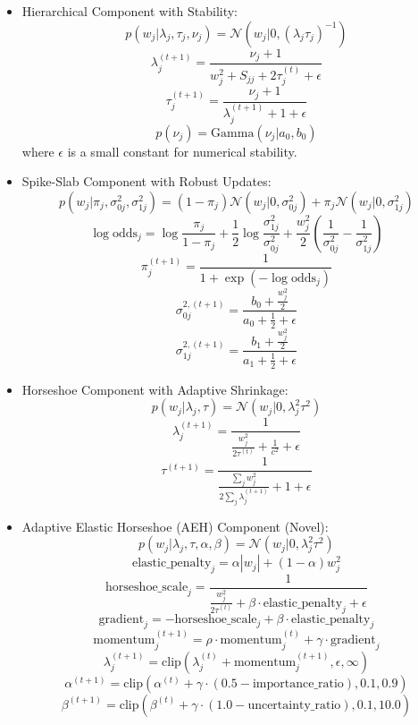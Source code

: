 \begin{itemize}

\item Hierarchical Component with Stability:
    \[
    p(w_j|\lambda_j,\tau_j,\nu_j) = \mathcal{N}(w_j|0,(\lambda_j\tau_j)^{-1})
    \]
    \[
    \lambda_j^{(t+1)} = \frac{\nu_j + 1}{w_j^2 + S_{jj} + 2\tau_j^{(t)} + \epsilon}
    \]
    \[
    \tau_j^{(t+1)} = \frac{\nu_j + 1}{\lambda_j^{(t+1)} + 1 + \epsilon}
    \]
    \[
    p(\nu_j) = \text{Gamma}(\nu_j|a_0,b_0)
    \]
    where $\epsilon$ is a small constant for numerical stability.

\item Spike-Slab Component with Robust Updates:
    \[
    p(w_j|\pi_j,\sigma^2_{0j},\sigma^2_{1j}) = (1-\pi_j)\mathcal{N}(w_j|0,\sigma^2_{0j}) + \pi_j\mathcal{N}(w_j|0,\sigma^2_{1j})
    \]
    \[
    \log \text{odds}_j = \log\frac{\pi_j}{1-\pi_j} + \frac{1}{2}\log\frac{\sigma^2_{1j}}{\sigma^2_{0j}} + \frac{w_j^2}{2}(\frac{1}{\sigma^2_{0j}} - \frac{1}{\sigma^2_{1j}})
    \]
    \[
    \pi_j^{(t+1)} = \frac{1}{1 + \exp(-\log \text{odds}_j)}
    \]
    \[
    \sigma_{0j}^{2,(t+1)} = \frac{b_0 + \frac{w_j^2}{2}}{a_0 + \frac{1}{2} + \epsilon}
    \]
    \[
    \sigma_{1j}^{2,(t+1)} = \frac{b_1 + \frac{w_j^2}{2}}{a_1 + \frac{1}{2} + \epsilon}
    \]

\item Horseshoe Component with Adaptive Shrinkage:
    \[
    p(w_j|\lambda_j,\tau) = \mathcal{N}(w_j|0,\lambda_j^2\tau^2)
    \]
    \[
    \lambda_j^{(t+1)} = \frac{1}{\frac{w_j^2}{2\tau^{(t)}} + \frac{1}{c^2} + \epsilon}
    \]
    \[
    \tau^{(t+1)} = \frac{1}{\frac{\sum_j w_j^2}{2\sum_j \lambda_j^{(t+1)}} + 1 + \epsilon}
    \]

\item Adaptive Elastic Horseshoe (AEH) Component (Novel):
    \[
    p(w_j|\lambda_j,\tau,\alpha,\beta) = \mathcal{N}(w_j|0,\lambda_j^2\tau^2)
    \]
    \[
    \text{elastic\_penalty}_j = \alpha|w_j| + (1-\alpha)w_j^2
    \]
    \[
    \text{horseshoe\_scale}_j = \frac{1}{\frac{w_j^2}{2\tau^{(t)}} + \beta \cdot \text{elastic\_penalty}_j + \epsilon}
    \]
    \[
    \text{gradient}_j = -\text{horseshoe\_scale}_j + \beta \cdot \text{elastic\_penalty}_j
    \]
    \[
    \text{momentum}_j^{(t+1)} = \rho \cdot \text{momentum}_j^{(t)} + \gamma \cdot \text{gradient}_j
    \]
    \[
    \lambda_j^{(t+1)} = \text{clip}(\lambda_j^{(t)} + \text{momentum}_j^{(t+1)}, \epsilon, \infty)
    \]
    \[
    \alpha^{(t+1)} = \text{clip}(\alpha^{(t)} + \gamma \cdot (0.5 - \text{importance\_ratio}), 0.1, 0.9)
    \]
    \[
    \beta^{(t+1)} = \text{clip}(\beta^{(t)} + \gamma \cdot (1.0 - \text{uncertainty\_ratio}), 0.1, 10.0)
    \]
    
\end{itemize}

